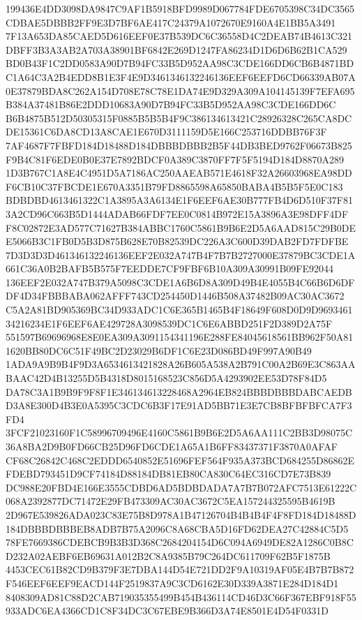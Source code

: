 \documentclass[UTF8,fontset=fandol,zihao=-4,a4paper]{ctexart}
\begin{document}
{{199436E4DD3098DA9847C9AF1B5918BFD9989D067784FDE6705398C34DC3565CDBAE5DBBB2FF9E3D7BF6AE417C24379A1072670E9160A4E1BB5A3491
7F13A653DA85CAED5D616EEF0E37B539DC6C36558D4C2DEAB74B4613C321DBFF3B3A3AB2A703A38901BF6842E269D1247FA86234D1D6D6B62B1CA529
BD0B43F1C2DD0583A90D7B94FC33B5D952AA98C3CDE166DD6CB6B4871BDC1A64C3A2B4EDD8B1E3F4E9D3461346132246136EEF6EEFD6CD66339AB07A
0E37879BDA8C262A154D708E78C78E1DA74E9D329A309A104145139F7EFA695B384A37481B86E2DDD10683A90D7B94FC33B5D952AA98C3CDE166DD6C
B6B4875B512D50305315F0885B5B5B4F9C386134613421C28926328C265CA8DCDE15361C6DA8CD13A8CAE1E670D3111159D5E166C253716DDBB76F3F
7AF4687F7FBFD184D18488D184DBBBDBBB2B5F44DB3BED9762F06673B825F9B4C81F6EDE0B0E37E7892BDCF0A389C3870FF7F5F5194D184D8870A289
1D3B767C1A8E4C4951D5A7186AC250AAEAB571E4618F32A26603968EA98DDF6CB10C37FBCDE1E670A3351B79FD8865598A65850BABA4B5B5F5E0C183
BDBDBD4613461322C1A3895A3A6134E1F6EEF6AE30B777FB4D6D510F37F813A2CD96C663B5D1444ADAB66FDF7EE0C0814B972E15A3896A3E98DFF4DF
F8C02872E3AD577C71627B384ABBC1760C5861B9B6E2D5A6AAD815C29B0DEE5066B3C1FB0D5B3D875B628E70B82539DC226A3C600D39DAB2FD7FDFBE
7D3D3D3D461346132246136EEF2E032A747B4F7B7B2727000E37879BC3CDE1A661C36A0B2BAFB5B575F7EEDDE7CF9FBF6B10A309A30991B09FE92044
136EEF2E032A747B379A5098C3CDE1A6B6D8A309D49B4E4055B4C66B6D6DFDF4D34FBBBABA062AFFF743CD254450D1446B508A37482B09AC30AC3672
C5A2A81BD905369BC34D933ADC1C6E365B1465B4F18649F608D0D9D969346134216234E1F6EEF6AE429728A3098539DC1C6E6ABBD251F2D389D2A75F
551597B69696968E8E0EA309A3091154341196E288FE84045618561BB962F50A811620BB80DC6C51F49BC2D23029B6DF1C6E23D086BD49F997A90B49
1ADA9A9B9B4F9D3A6534613421828A26B605A538A2B791C00A2B69E3C863AABAAC42D4B13255D5B4318D8015168523C856D5A4293902EE53D78F84D5
DA78C3A1B9B9F9F8F1E346134613228468A2964EB824BBBDBBBDABCAEDBD3A8E300D4B3E0A5395C3CDC6B3F17E91AD5BB71E3E7CB8BFBFBFCA7F3FD4
3FCF21023160F1C58996709496E4160C5861B9B6E2D5A6AA111C2BB3D98075C36A8BA2D9B0FD66CB25D96FD6CDE1A65A1B6FF83437371F3870A0AFAF
CF68C26842C468C2EDDD6540852E51696FEF564F935A373BCD684255D86862EFDEBD793451D9CF74184D88184DB81EB80CA830C64EC316CD7E73B839
DC988E20FBD4E166E3555CDBD6AD5BDBDADA7A7B7B072AFC7513E61222C068A2392877DC71472E29FB473309AC30AC3672C5EA157244325595B4619B
2D967E539826ADA023C83E75B8D978A1B47126704B4B4B4F4F8FD184D18488D184DBBBDBBBEB8ADB7B75A2096C8A68CBA5D16FD62DEA27C42884C5D5
78FE7669386CDEBCB9B3B3D368C2684204154D6C094A6949DE82A1286C0B8CD232A02AEBF6EB69631A012B2C8A9385B79C264DC611709F62B5F1875B
4453CEC61B82CD9B379F3E7DBA144D54E721DD2F9A10319AF05E4B7B7B872F546EEF6EEF9EACD144F2519837A9C3CD6162E30D339A3871E284D184D1
8408309AD81C88D2CAB719035355499B454B436114CD46D3C66F367EBF918F55933ADC6EA4366CD1C8F34DC3C67EBE9B366D3A74E8501E4D54F0331D
}}
\end{document}
